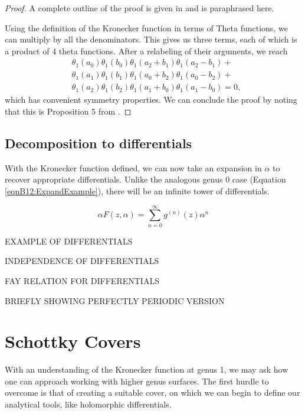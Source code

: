 \begin{proof}
    A complete outline of the proof is given in \cite{Mat19} and is paraphrased here.

    Using the definition of the Kronecker function in terms of Theta functions, we can multiply by all the denominators.
    This gives us three terms, each of which is a product of 4 theta functions. After a relabeling of their arguments, we reach
    \begin{align}
        & \theta_1(a_0)\theta_1(b_0)\theta_1(a_2+b_1)\theta_1(a_2-b_1) + \\
        & \theta_1(a_1)\theta_1(b_1)\theta_1(a_0+b_2)\theta_1(a_0-b_2) + \\
        & \theta_1(a_2)\theta_1(b_2)\theta_1(a_1+b_0)\theta_1(a_1-b_0) = 0,
    \end{align}
    which has convenient symmetry properties. We can conclude the proof by noting that this is Proposition 5 from \cite{Zagier1991}.
\end{proof}

\subsection{Decomposition to differentials}

With the Kronecker function defined, we can now take an expansion in $\alpha$ to recover appropriate differentials. Unlike the analogous genus 0 case (Equation \ref{eqnB12:ExpandExample}), there will be an infinite tower of differentials.

\begin{definition}
    \begin{equation}
        \alpha F(z,\alpha) = \sum_{n=0}^{\infty} g^{(n)}(z) \alpha^n
    \end{equation}
\end{definition}

EXAMPLE OF DIFFERENTIALS

INDEPENDENCE OF DIFFERENTIALS

FAY RELATION FOR DIFFERENTIALS

BRIEFLY SHOWING PERFECTLY PERIODIC VERSION

\section{Schottky Covers}\label{secB12:Schottky}

With an understanding of the Kronecker function at genus 1, we may ask how one can approach working with higher genus surfaces.
The first hurdle to overcome is that of creating a suitable cover, on which we can begin to define our analytical tools, like holomorphic differentials.

